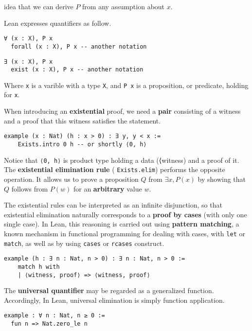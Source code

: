 idea that we can derive $P$ from any assumption about $x$.
\begin{example}
  Lean expresses quantifiers as follow.
  \begin{lstlisting}[language=lean, caption=For All]
  ∀ (x : X), P x
  forall (x : X), P x -- another notation
  \end{lstlisting}
  \begin{lstlisting}[language=lean, caption=Exists]
  ∃ (x : X), P x
  exist (x : X), P x -- another notation
  \end{lstlisting}
  Where \lstinline[language=lean]|x| is a varible with a type \lstinline[language=lean]|X|,
  and \lstinline[language=lean]|P x| is a proposition, or predicate, holding for \lstinline[language=lean]|x|.
\end{example}

\begin{example}
  When introducing an \textbf{existential} proof,
  we need a \textbf{pair} consisting
  of a witness and a proof that this witness
  satisfies the statement.
  \begin{lstlisting}[language=lean]
  example (x : Nat) (h : x > 0) : ∃ y, y < x :=
    Exists.intro 0 h -- or shortly ⟨0, h⟩
\end{lstlisting}
\end{example}
Notice that \lstinline[language=lean]|⟨0, h⟩| is product type holding a data (⟨witness)
and a proof of it.
The \textbf{existential elimination rule}
( \lstinline[language=lean]|Exists.elim|) performs the opposite operation.
It allows us to prove a proposition $Q$
from $\exists x, P(x)$ by showing
that $Q$  follows from $P(w)$  for an \textbf{arbitrary}
value $w$.
\begin{example}
  The existential rules can be interpreted as an infinite
  disjunction,
  so that existential elimination naturally corresponds to a \textbf{proof by cases}
  (with only one single case).
  In Lean, this reasoning is carried out using \textbf{pattern matching},
  a known mechanism in functional programming for dealing with cases,
  with \lstinline[language=lean]|let| or \lstinline[language=lean]|match|,
  as well as by using \lstinline[language=lean]|cases| or
  \lstinline[language=lean]|rcases| construct.
  \begin{lstlisting}[language=lean]
  example (h : ∃ n : Nat, n > 0) : ∃ n : Nat, n > 0 :=
    match h with
    | ⟨witness, proof⟩ => ⟨witness, proof⟩
  \end{lstlisting}
\end{example}
\begin{example}
  The \textbf{universal quantifier} may be regarded as a generalized function.
  Accordingly, In Lean, universal elimination is simply function application.
  \begin{lstlisting}[language=lean]
example : ∀ n : Nat, n ≥ 0 :=
  fun n => Nat.zero_le n
\end{lstlisting}
\end{example}
